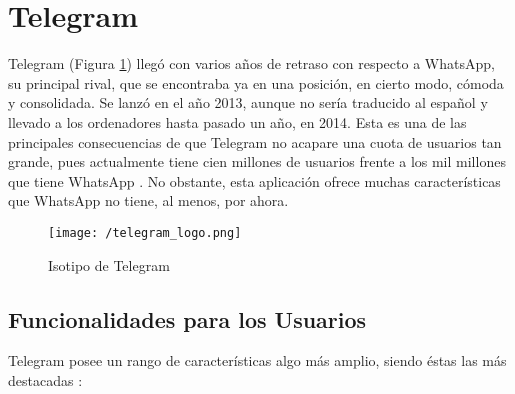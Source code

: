 \clearpage

\section{Telegram}
\label{sec:telegram}

Telegram (Figura \ref{fig:telegram}) llegó con varios años de retraso con respecto a WhatsApp, su principal rival, que se encontraba ya en una posición, en cierto modo, cómoda y consolidada. Se lanzó en el año 2013, aunque no sería traducido al español y llevado a los ordenadores hasta pasado un año, en 2014. Esta es una de las principales consecuencias de que Telegram no acapare una cuota de usuarios tan grande, pues actualmente tiene cien millones de usuarios frente a los mil millones que tiene WhatsApp \cite{Ramirez2017}. No obstante, esta aplicación ofrece muchas características que WhatsApp no tiene, al menos, por ahora.

\begin{figure}[!h]
	\begin{center}
		\texttt{[image: /telegram\_logo.png]}
		\caption{Isotipo de Telegram}
		\label{fig:telegram}
	\end{center}
\end{figure}

\subsection{Funcionalidades para los Usuarios}
Telegram posee un rango de características algo más amplio, siendo éstas las más destacadas \cite{Telegram2017}:

